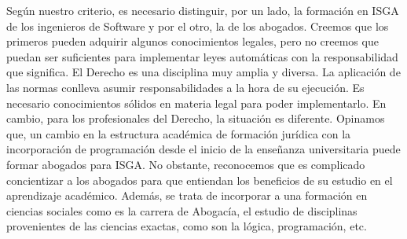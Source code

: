 \documentclass[12pt]{report} %
\begin{document}
Según nuestro criterio, es necesario distinguir, por un lado, la formación en ISGA de los ingenieros de Software y por el otro, la de los abogados. Creemos que los primeros pueden adquirir algunos conocimientos legales, pero no creemos que puedan ser suficientes para implementar leyes automáticas con la responsabilidad que significa. El Derecho es una disciplina muy amplia y diversa. La aplicación de las normas conlleva asumir responsabilidades a la hora de su ejecución. Es necesario conocimientos sólidos en materia legal para poder implementarlo. En cambio, para los profesionales del Derecho, la situación es diferente. Opinamos que, un cambio en la estructura académica de formación jurídica con la incorporación de programación desde el inicio de la enseñanza universitaria puede formar abogados para ISGA. No obstante, reconocemos que es complicado concientizar a los abogados para que entiendan los beneficios de su estudio en el aprendizaje académico. Además, se trata de incorporar a una formación en ciencias sociales como es la carrera de Abogacía, el estudio de disciplinas provenientes de las ciencias exactas, como son la lógica, programación, etc.
\end{document}
